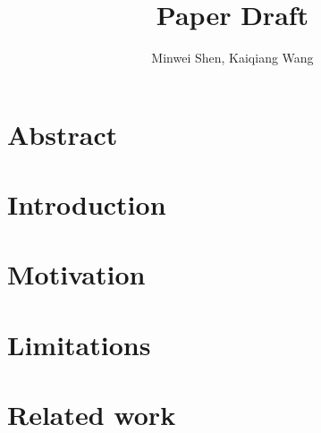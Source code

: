 \documentclass[letterpaper,twocolumn,10pt]{article}
\title{Paper Draft}
\author{Minwei Shen, Kaiqiang Wang}
\affil{School of Computing, University of Utah}
\begin{document}
\maketitle

\section{Abstract}


\section{Introduction}


\section{Motivation}


\section{Limitations}


\section{Related work}

 
 
 
  \small 
  
  
\end{document}
